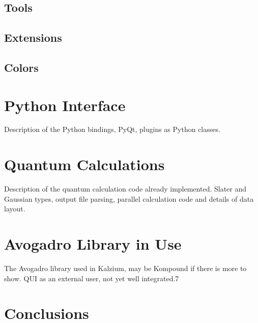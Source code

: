 \documentclass{article}
\begin{document}
\subsection{Tools}

\subsection{Extensions}

\subsection{Colors}

\section{Python Interface}

Description of the Python bindings, PyQt, plugins as Python classes.

\section{Quantum Calculations}

Description of the quantum calculation code already implemented. Slater and Gaussian types, output file parsing, parallel calculation code and details of data layout.

\section{Avogadro Library in Use}

The Avogadro library used in Kalzium, may be Kompound if there is more to show. QUI as an external user, not yet well integrated.7

\section{Conclusions}



\end{document}
